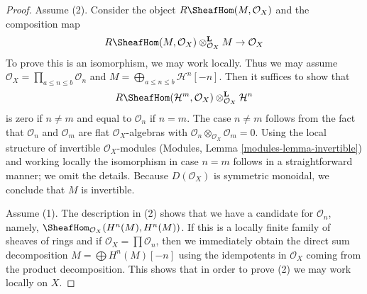 \begin{proof}

Assume (2). Consider the object $R\SheafHom(M, \mathcal{O}_X)$
and the composition map
$$
R\SheafHom(M, \mathcal{O}_X) \otimes_{\mathcal{O}_X}^\mathbf{L} M \to
\mathcal{O}_X
$$
To prove this is an isomorphism, we may work locally. Thus we may
assume $\mathcal{O}_X = \prod_{a \leq n \leq b} \mathcal{O}_n$
and $M = \bigoplus_{a \leq n \leq b} \mathcal{H}^n[-n]$.
Then it suffices to show that
$$
R\SheafHom(\mathcal{H}^m, \mathcal{O}_X)
\otimes_{\mathcal{O}_X}^\mathbf{L} \mathcal{H}^n
$$
is zero if $n \not = m$ and equal to $\mathcal{O}_n$ if $n = m$.
The case $n \not = m$ follows from the fact that $\mathcal{O}_n$ and
$\mathcal{O}_m$ are flat $\mathcal{O}_X$-algebras with
$\mathcal{O}_n \otimes_{\mathcal{O}_X} \mathcal{O}_m = 0$.
Using the local structure of invertible $\mathcal{O}_X$-modules
(Modules, Lemma \ref{modules-lemma-invertible}) and working locally
the isomorphism in case $n = m$ follows in a straightforward manner;
we omit the details. Because $D(\mathcal{O}_X)$ is symmetric monoidal,
we conclude that $M$ is invertible.

\medskip\noindent
Assume (1). The description in (2) shows that we have a candidate
for $\mathcal{O}_n$, namely,
$\SheafHom_{\mathcal{O}_X}(H^n(M), H^n(M))$.
If this is a locally finite family of sheaves of rings
and if $\mathcal{O}_X = \prod \mathcal{O}_n$, then we immediately
obtain the direct sum decomposition $M = \bigoplus H^n(M)[-n]$
using the idempotents in $\mathcal{O}_X$ coming from the product
decomposition.
This shows that in order to prove (2) we may work locally on $X$.


\end{proof}
